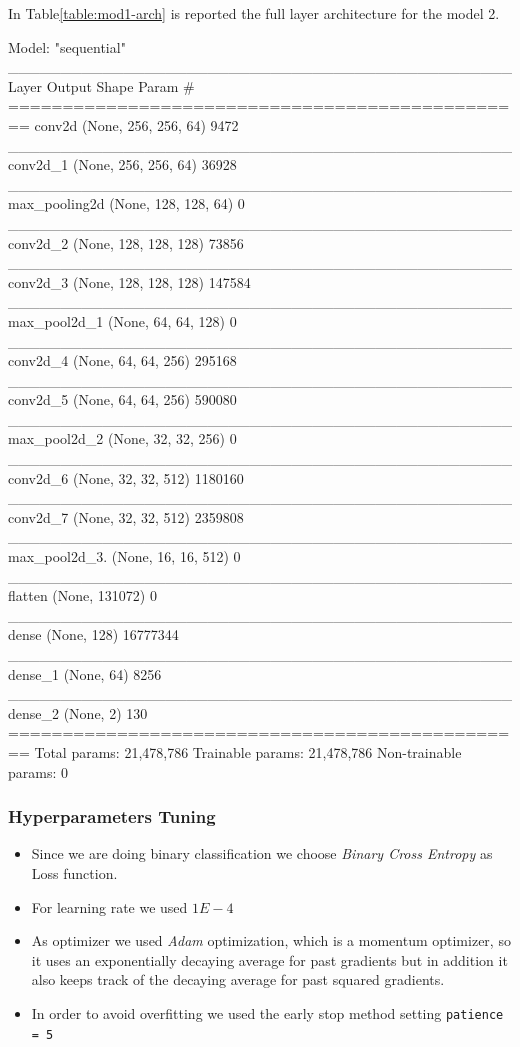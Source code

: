\documentclass[conference]{IEEEtran}
\begin{document}
In Table\ref{table:mod1-arch} is reported the full layer architecture for the model 2.
\begin{table}[ht!] %
\centering
\caption{Layer Architecture}
\begin{verbnobox}[\fontsize{8pt}{8pt}\selectfont]
Model: "sequential"
________________________________________________
Layer           Output Shape           Param #   
================================================
conv2d         (None, 256, 256, 64)    9472      
________________________________________________
conv2d_1       (None, 256, 256, 64)    36928     
________________________________________________
max_pooling2d  (None, 128, 128, 64)    0         
________________________________________________
conv2d_2       (None, 128, 128, 128)   73856     
________________________________________________
conv2d_3       (None, 128, 128, 128)   147584    
________________________________________________
max_pool2d_1   (None, 64, 64, 128)     0         
________________________________________________
conv2d_4       (None, 64, 64, 256)     295168    
________________________________________________
conv2d_5       (None, 64, 64, 256)     590080    
________________________________________________
max_pool2d_2   (None, 32, 32, 256)     0         
________________________________________________
conv2d_6       (None, 32, 32, 512)     1180160   
________________________________________________
conv2d_7       (None, 32, 32, 512)     2359808   
________________________________________________
max_pool2d_3.  (None, 16, 16, 512)     0         
________________________________________________
flatten        (None, 131072)          0         
________________________________________________
dense          (None, 128)             16777344  
________________________________________________
dense_1        (None, 64)              8256      
________________________________________________
dense_2        (None, 2)               130       
================================================
Total params: 21,478,786
Trainable params: 21,478,786
Non-trainable params: 0
\end{verbnobox}
\label{table:mod1-arch}
\end{table}

\subsubsection{Hyperparameters Tuning}
\begin{itemize}
    \item Since we are doing binary classification we choose \textit{Binary Cross Entropy} as Loss function.
    \item For learning rate we used $1E-4$
    \item As optimizer we used \textit{Adam} optimization, which is a momentum optimizer, so it uses an exponentially decaying average for past gradients but in addition it also keeps track of the decaying average for past squared gradients. 
    \item In order to avoid overfitting we used the early stop method setting \texttt{patience = 5}
\end{itemize}
\end{document}
